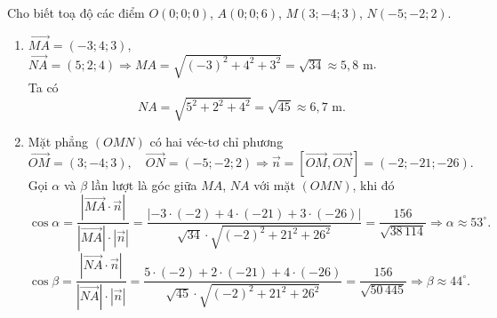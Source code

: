 \begin{ex}
{\begin{center}
		\end{center}
		Cho  biết toạ độ các điểm
		 $
		O(0;0;0)$, $ A(0;0;6)$, $ M(3;-4;3)$,  $ N(-5;-2;2)$.
		\begin{enumerate}
			\item $ 
			\overrightarrow{MA} =  (-3;4;3)$, $\overrightarrow{NA} = (5;2;4)
			\Rightarrow MA = \sqrt{(-3)^2 + 4^2  + 3^2} = \sqrt{34} \approx 5{,}8\text{ m}
			 $.\\
			Ta  có
			 $$
			NA = \sqrt{5^2 + 2^2  + 4^2} = \sqrt{45} \approx 6{,}7\text{ m}.
			$$ 
			\item Mặt phẳng $(OMN)$ có hai véc-tơ chỉ phương 
			 $$
			\overrightarrow{OM} = (3;-4;3),\quad \overrightarrow{ON}  = (-5;-2;2)
			\Rightarrow \overrightarrow{n} = \left[\overrightarrow{OM}, \overrightarrow{ON}\right] = (-2;  -21; -26).
			 $$
			Gọi $\alpha$ và $\beta$ lần lượt là  góc giữa $MA$, $NA$ với mặt $(OMN)$, khi đó
			 $$
			\cos\alpha = \dfrac{\left|\overrightarrow{MA} \cdot  \overrightarrow{n}\right|}{\left|\overrightarrow{MA}\right|\cdot \left|\overrightarrow{n}\right|} =
			\dfrac{\left|-3 \cdot (-2) + 4 \cdot (-21) + 3 \cdot (-26)\right|}{\sqrt{34} \cdot \sqrt{(-2)^2 + 21^2 +  26^2}} = \dfrac{156}{\sqrt{38\, 114}}
			\Rightarrow  \alpha \approx 53^\circ.
			$$ 
			 $$
			\cos\beta  = \dfrac{\left|\overrightarrow{NA} \cdot \overrightarrow{n}\right|}{\left|\overrightarrow{NA}\right|\cdot \left|\overrightarrow{n}\right|} =
			\dfrac{5 \cdot (-2) + 2 \cdot (-21) + 4 \cdot (-26)}{\sqrt{45} \cdot \sqrt{(-2)^2 + 21^2 + 26^2}} =  \dfrac{156}{\sqrt{50\,445}} \Rightarrow \beta \approx 44^\circ.
			 $$
		\end{enumerate}
	 }
\end{ex}

